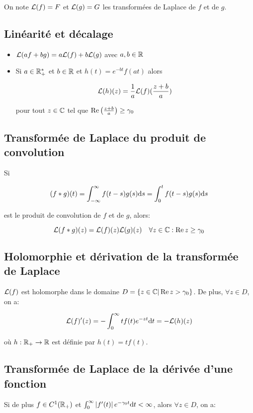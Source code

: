 On note $\mathcal{L}(f) = F$ et $\mathcal{L}(g) = G$ les transformées de Laplace de $f$ et de $g$.

\subsection{Linéarité et décalage}

\begin{itemize}
    \item 
    $\mathcal{L}(af + bg) = a \mathcal{L}(f) + b \mathcal{L}(g)$ avec $a, b \in \mathbb{R}$
    \item 
    Si $a \in \mathbb{R}_+^\ast$ et $b \in \mathbb{R}$ et $h(t) = e^{-bt} f(at)$ alors
    
    \[ \mathcal{L}(h)(z) = \frac{1}{a} \mathcal{L}(f)(\frac{z + b}{a}) \]
    
    pour tout $z \in \mathbb{C}$ tel que $\operatorname{Re}\left(\frac{z + b}{a}\right) \geq \gamma_0$
\end{itemize}

\subsection{Transformée de Laplace du produit de convolution}

Si

    \[
        (f \ast g)(t)
        = \int_{-\infty}^\infty f(t - s)g(s) \mathrm{d}s
        = \int_0^t f(t-s)g(s) \mathrm{d}s
    \]

est le produit de convolution de $f$ et de $g$, alors:

\[
    \mathcal{L}(f \ast g)(z) = \mathcal{L}(f)(z)\mathcal{L}(g)(z) \quad \forall z \in \mathbb{C} : \operatorname{Re} z \geq \gamma_0
\]

\subsection{Holomorphie et dérivation de la transformée de Laplace}

$\mathcal{L}(f)$ est holomorphe dans le domaine $D = \{ z \in \mathbb{C} | \operatorname{Re} z > \gamma_0 \}$.
De plus, $\forall z \in D$, on a:

\[ \mathcal{L}(f)'(z) = - \int_0^\infty t f(t) e^{-zt} \mathrm{d}t = - \mathcal{L}(h)(z) \]

où $h: \mathbb{R}_+ \rightarrow \mathbb{R}$ est définie par $h(t) = tf(t)$.

\subsection{Transformée de Laplace de la dérivée d'une fonction}

Si de plus $f \in C^1(\mathbb{R}_+)$ et $\int_0^\infty \left|f'(t)\right| e^{-\gamma_0 t} \mathrm{d}t < \infty$, alors $\forall z \in D$, on a:

